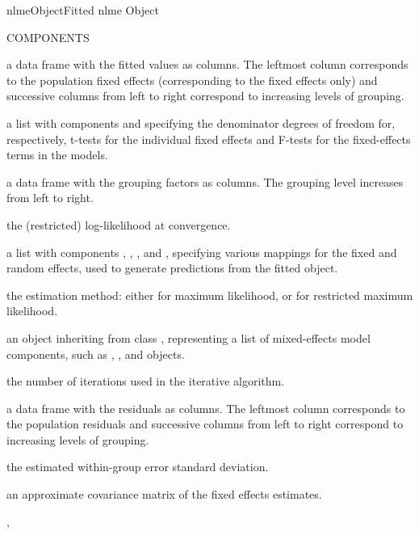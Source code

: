 \documentclass[pdftex]{article} \usepackage{url,graphicx}
\begin{document}
\begin{Helpfile}{nlmeObject}{Fitted nlme Object}
\begin{Argument}{COMPONENTS}
\item[\Co{fitted:}]
a data frame with the fitted values as columns. The
leftmost column corresponds to the population fixed effects
(corresponding to the fixed effects only) and successive columns
from left to right correspond to increasing levels of grouping.
\item[\Co{fixDF:}]
a list with components  and 
specifying the denominator degrees of freedom for, respectively,
t-tests for the individual fixed effects and F-tests for the
fixed-effects terms in the models.
\item[\Co{groups:}]
a data frame with the grouping factors as
columns. The grouping level increases from left to right.
\item[\Co{logLik:}]
the (restricted) log-likelihood at convergence.
\item[\Co{map:}]
a list with components , ,
, and , specifying various mappings for the
fixed and random effects, used to generate predictions from the
fitted object.
\item[\Co{method:}]
the estimation method: either  for maximum
likelihood, or  for restricted maximum likelihood.
\item[\Co{modelStruct:}]
an object inheriting from class ,
representing a list of mixed-effects model components, such
as , , and  objects.
\item[\Co{numIter:}]
the number of iterations used in the iterative
algorithm.
\item[\Co{residuals:}]
a data frame with the residuals as columns. The
leftmost column corresponds to the population residuals
and successive columns from left to right correspond to increasing
levels of grouping.
\item[\Co{sigma:}]
the estimated within-group error standard deviation.
\item[\Co{varFix:}]
an approximate covariance matrix of the
fixed effects estimates.
\end{Argument}
, 
\end{Helpfile}
\end{document}
